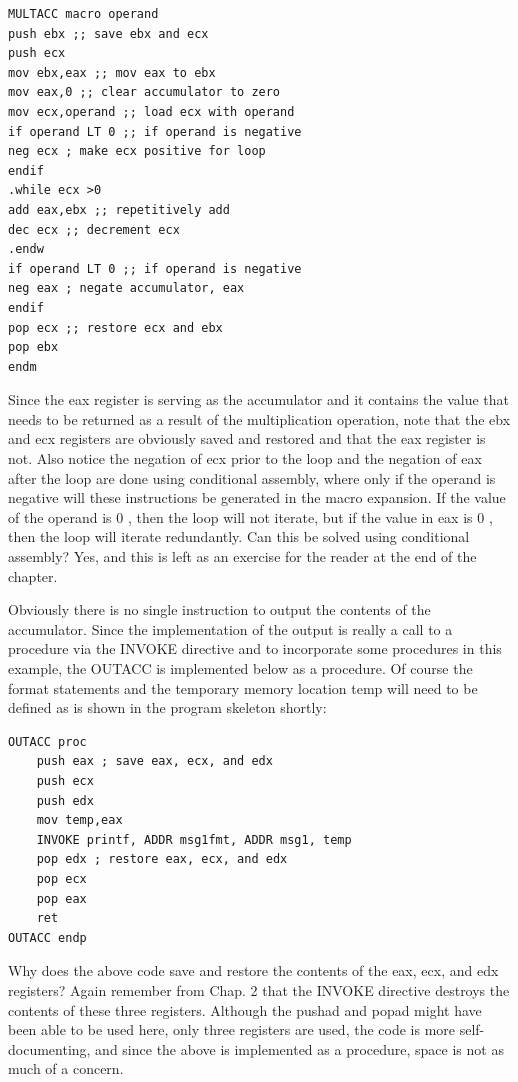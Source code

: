 \documentclass[10pt]{article}
\begin{document}
\begin{verbatim}
MULTACC macro operand
push ebx ;; save ebx and ecx
push ecx
mov ebx,eax ;; mov eax to ebx
mov eax,0 ;; clear accumulator to zero
mov ecx,operand ;; load ecx with operand
if operand LT 0 ;; if operand is negative
neg ecx ; make ecx positive for loop
endif
.while ecx >0
add eax,ebx ;; repetitively add
dec ecx ;; decrement ecx
.endw
if operand LT 0 ;; if operand is negative
neg eax ; negate accumulator, eax
endif
pop ecx ;; restore ecx and ebx
pop ebx
endm
\end{verbatim}

Since the eax register is serving as the accumulator and it contains the value that needs to be returned as a result of the multiplication operation, note that the ebx and ecx registers are obviously saved and restored and that the eax register is not. Also notice the negation of ecx prior to the loop and the negation of eax after the loop are done using conditional assembly, where only if the operand is negative will these instructions be generated in the macro expansion. If the value of the operand is 0 , then the loop will not iterate, but if the value in eax is 0 , then the loop will iterate redundantly. Can this be solved using conditional assembly? Yes, and this is left as an exercise for the reader at the end of the chapter.

Obviously there is no single instruction to output the contents of the accumulator. Since the implementation of the output is really a call to a procedure via the INVOKE directive and to incorporate some procedures in this example, the OUTACC is implemented below as a procedure. Of course the format statements and the temporary memory location temp will need to be defined as is shown in the program skeleton shortly:

\begin{verbatim}
OUTACC proc
    push eax ; save eax, ecx, and edx
    push ecx
    push edx
    mov temp,eax
    INVOKE printf, ADDR msg1fmt, ADDR msg1, temp
    pop edx ; restore eax, ecx, and edx
    pop ecx
    pop eax
    ret
OUTACC endp
\end{verbatim}

Why does the above code save and restore the contents of the eax, ecx, and edx registers? Again remember from Chap. 2 that the INVOKE directive destroys the contents of these three registers. Although the pushad and popad might have been able to be used here, only three registers are used, the code is more self-documenting, and since the above is implemented as a procedure, space is not as much of a concern.
\end{document}
